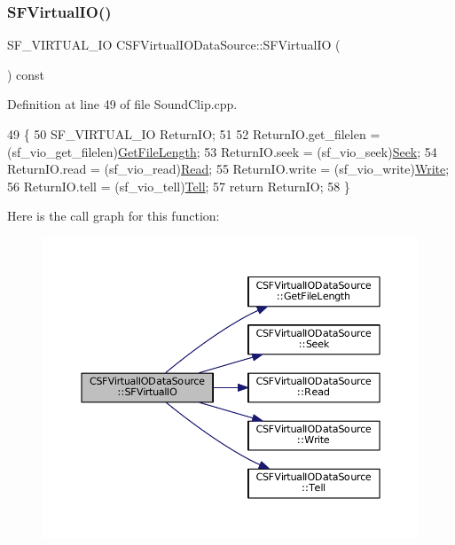 \subsubsection{\texorpdfstring{S\+F\+Virtual\+I\+O()}{SFVirtualIO()}}
{\footnotesize\ttfamily S\+F\+\_\+\+V\+I\+R\+T\+U\+A\+L\+\_\+\+IO C\+S\+F\+Virtual\+I\+O\+Data\+Source\+::\+S\+F\+Virtual\+IO (\begin{DoxyParamCaption}{ }\end{DoxyParamCaption}) const}



Definition at line 49 of file Sound\+Clip.\+cpp.


\begin{DoxyCode}
49                                                        \{
50     SF\_VIRTUAL\_IO ReturnIO;
51     
52     ReturnIO.get\_filelen = (sf\_vio\_get\_filelen)\hyperlink{classCSFVirtualIODataSource_a94ee0d9f4703661ca7f2cad8cf294690}{GetFileLength};   
53     ReturnIO.seek = (sf\_vio\_seek)\hyperlink{classCSFVirtualIODataSource_a04735e135ffc05dd53fce944e772fcfc}{Seek};
54     ReturnIO.read = (sf\_vio\_read)\hyperlink{classCSFVirtualIODataSource_a40021962590f0911d8af1020397fbba1}{Read};
55     ReturnIO.write = (sf\_vio\_write)\hyperlink{classCSFVirtualIODataSource_ac1d38c4c9d8ba3e0a2affd7dd72283ee}{Write};   
56     ReturnIO.tell = (sf\_vio\_tell)\hyperlink{classCSFVirtualIODataSource_aae8e2b59f9753ed1f8baca1561b15962}{Tell};   
57     \textcolor{keywordflow}{return} ReturnIO;
58 \}
\end{DoxyCode}
Here is the call graph for this function\+:
\nopagebreak
\begin{figure}[H]
\begin{center}
\leavevmode
\includegraphics[width=350pt]{classCSFVirtualIODataSource_a9c15fbbe734fdfc2af17ca8f424b7e43_cgraph}
\end{center}
\end{figure}
